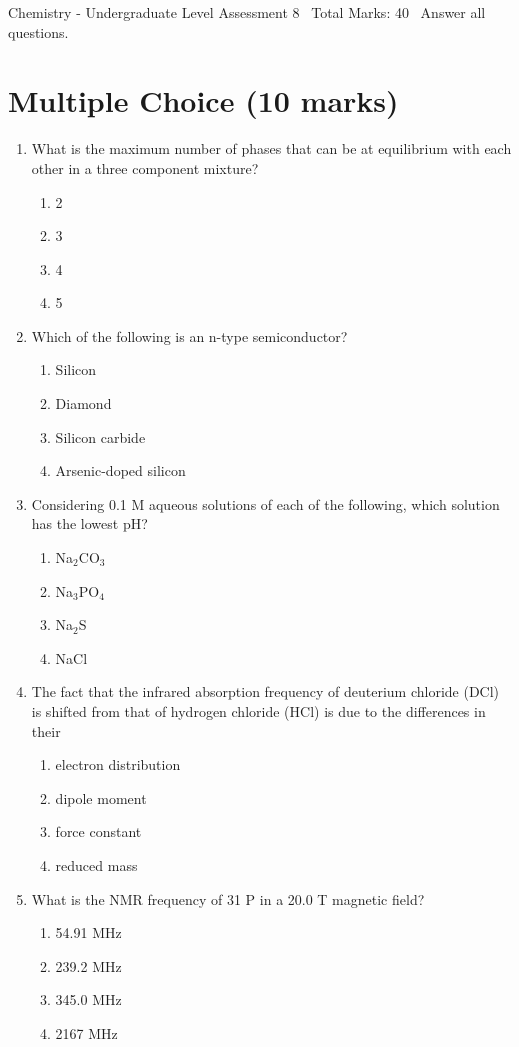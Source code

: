 \documentclass[12pt]{article}
\begin{document}
\begin{center}
Chemistry - Undergraduate Level Assessment 8 \
Total Marks: 40 \
Answer all questions.
\end{center}

\section*{Multiple Choice (10 marks)}
\begin{enumerate}[label=\arabic*.]
\item What is the maximum number of phases that can be at equilibrium with each other in a three component mixture?
\begin{enumerate}[label=(\alph*)]
    \item 2
    \item 3
    \item 4
    \item 5
\end{enumerate}
\item Which of the following is an n-type semiconductor?
\begin{enumerate}[label=(\alph*)]
    \item Silicon
    \item Diamond
    \item Silicon carbide
    \item Arsenic-doped silicon
\end{enumerate}
\item Considering 0.1 M aqueous solutions of each of the following, which solution has the lowest pH?
\begin{enumerate}[label=(\alph*)]
    \item Na$_{2}$CO$_{3}$
    \item Na$_{3}$PO$_{4}$
    \item Na$_{2}$S
    \item NaCl
\end{enumerate}
\item The fact that the infrared absorption frequency of deuterium chloride (DCl) is shifted from that of hydrogen chloride (HCl) is due to the differences in their
\begin{enumerate}[label=(\alph*)]
    \item electron distribution
    \item dipole moment
    \item force constant
    \item reduced mass
\end{enumerate}
\item What is the NMR frequency of 31 P in a 20.0 T magnetic field?
\begin{enumerate}[label=(\alph*)]
    \item 54.91 MHz
    \item 239.2 MHz
    \item 345.0 MHz
    \item 2167 MHz
\end{enumerate}
\end{enumerate}
\end{document}
